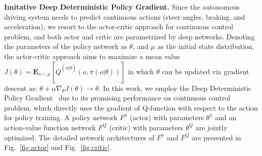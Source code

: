 \documentclass[runningheads]{llncs}
\begin{document}
\noindent\textbf{Imitative Deep Deterministic Policy Gradient.} Since the autonomous driving system needs to predict continuous actions (steer angles, braking, and acceleration), we resort to the actor-critic approach for continuous control problem, and both actor and critic are parametrized by deep networks. Denoting the parameters of the policy network as $\theta$, and $\mu$ as the initial state distribution, the actor-critic approach aims to maximize a mean value $J(\theta) =\mathbf{E}_{o\sim \mu}[Q^{(\pi\dot|\theta)}(o,\pi(o|\theta))]$ in which $\theta$ can be updated via gradient descent as: $\theta + \alpha\nabla_\theta J(\theta)\rightarrow \theta$. In this work, we employ the Deep Deterministic Policy Gradient~\cite{lillicrap2015continuous} due to its promising performance on continuous control problem, which directly uses the gradient of Q-function with respect to the action for policy training. A policy network $F^\pi$ (actor) with parameters $\theta^\pi$ and an action-value function network $F^Q$ (critic) with parameters $\theta^Q$ are jointly optimized. The detailed network architectures of $F^\pi$ and $F^Q$ are presented in Fig.~\ref{fig:actor} and Fig.~\ref{fig:critic}.   
    
\end{document}
